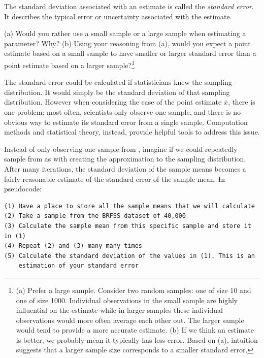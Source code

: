 \begin{termBox}{
The standard deviation associated with an estimate is called the \emph{standard error}. It describes the typical error or uncertainty associated with the estimate.}
\end{termBox}

\begin{exercise}
(a) Would you rather use a small sample or a large sample when estimating a parameter? Why? (b) Using your reasoning from (a), would you expect a point estimate based on a small sample to have smaller or larger standard error than a point estimate based on a larger sample?\footnote{(a) Prefer a large sample. Consider two random samples: one of size 10 and one of size 1000. Individual observations in the small sample are highly influential on the estimate while in larger samples these individual observations would more often average each other out. The larger sample would tend to provide a more accurate estimate. (b) If we think an estimate is better, we probably mean it typically has less error. Based on (a), intuition suggests that a larger sample size corresponds to a smaller standard error.}
\end{exercise}

The standard error could be calculated if statisticians knew the sampling distribution. It would simply be the standard deviation of that sampling distribution. However when considering the case of the point estimate $\bar{x}$, there is one problem: most often, scientists only observe one sample, and there is no obvious way to estimate its standard error from a single sample. Computation methods and statistical theory, instead, provide helpful tools to address this issue. 

Instead of only observing one sample from , imagine if we could repeatedly sample from  as with creating the approximation to the sampling distribution. After many iterations, the standard deviation of the sample means becomes a fairly reasonable estimate of the standard error of the sample mean. In pseudocode: 
\begin{verbatim}
(1) Have a place to store all the sample means that we will calculate
(2) Take a sample from the BRFSS dataset of 40,000
(3) Calculate the sample mean from this specific sample and store it in (1)
(4) Repeat (2) and (3) many many times 
(5) Calculate the standard deviation of the values in (1). This is an 
	estimation of your standard error
\end{verbatim}


